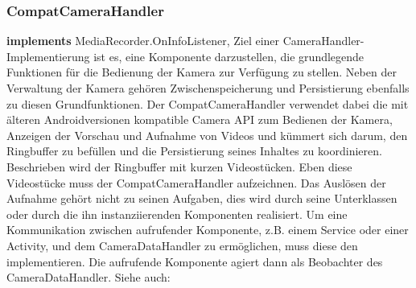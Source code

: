 \subsubsection{CompatCameraHandler} \label{app:klasse:CompatCameraHandler}
\textbf{implements} MediaRecorder.OnInfoListener,  \newline
Ziel einer CameraHandler-Implementierung ist es, eine Komponente darzustellen, die grundlegende Funktionen für die Bedienung der Kamera zur Verfügung zu stellen. Neben der Verwaltung der Kamera gehören Zwischenspeicherung und Persistierung ebenfalls zu diesen Grundfunktionen. Der CompatCameraHandler verwendet dabei die mit älteren Androidversionen kompatible Camera API zum Bedienen der Kamera, Anzeigen der Vorschau und Aufnahme von Videos und kümmert sich darum, den Ringbuffer zu befüllen und die Persistierung seines Inhaltes zu koordinieren. Beschrieben wird der Ringbuffer mit kurzen Videostücken. Eben diese Videostücke muss der CompatCameraHandler aufzeichnen.
Das Auslösen der Aufnahme gehört nicht zu seinen Aufgaben, dies wird durch seine Unterklassen oder durch die ihn instanziierenden Komponenten realisiert. Um eine Kommunikation zwischen aufrufender Komponente, z.B. einem Service oder einer Activity, und dem CameraDataHandler zu ermöglichen, muss diese den  implementieren. Die aufrufende Komponente agiert dann als Beobachter des CameraDataHandler.
\newline
Siehe auch: 


